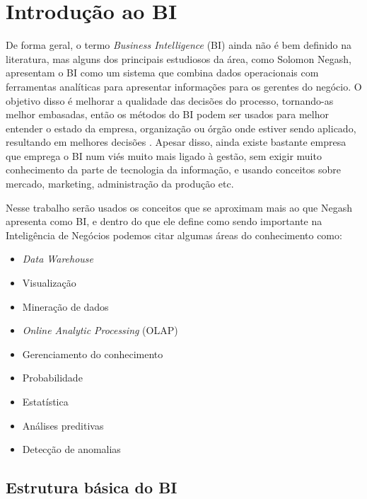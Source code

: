 \chapter{Introdução ao BI}\label{cap_trabalho_academico}


De forma geral, o termo \textit{Business Intelligence} (BI) ainda não é bem definido na literatura, mas alguns dos principais estudiosos da área, como Solomon Negash, apresentam o BI como um sistema que combina dados operacionais com ferramentas analíticas para apresentar informações para os gerentes do negócio. O objetivo disso é melhorar a qualidade das decisões do processo, tornando-as melhor embasadas, então os métodos do BI podem ser usados para melhor entender o estado da empresa, organização ou órgão onde estiver sendo aplicado, resultando em melhores decisões \cite{negash1}. Apesar disso, ainda existe bastante empresa que emprega o BI num viés muito mais ligado à gestão, sem exigir muito conhecimento da parte de tecnologia da informação, e usando conceitos sobre mercado, marketing, administração da produção etc.

Nesse trabalho serão usados os conceitos que se aproximam mais ao que Negash apresenta como BI, e dentro do que ele define como sendo importante na Inteligência de Negócios podemos citar algumas áreas do conhecimento como:

\begin{itemize}
	\item \textit{Data Warehouse}
	\item Visualização
	\item Mineração de dados
	\item \textit{Online Analytic Processing} (OLAP)
	\item Gerenciamento do conhecimento
	\item Probabilidade
	\item Estatística
	\item Análises preditivas
	\item Detecção de anomalias
\end{itemize}

\section{Estrutura básica do BI}

